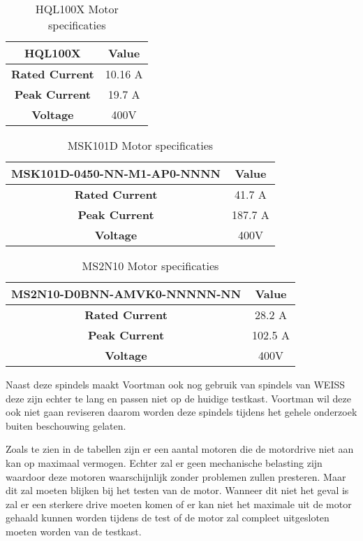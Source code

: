 \begin{table}[H]
	\caption{HQL100X Motor specificaties}
	\label{tab:HQL100X}
	\centering
	\begin{tabular}{|c|c|}
		\hline
		\textbf{HQL100X} & \textbf{Value} \\
		\hline
		\textbf{Rated Current} & 10.16 \gls{A} \\
		\textbf{Peak Current} & 19.7 \gls{A} \\
		\textbf{Voltage} & 400\gls{V} \\
		\hline
	\end{tabular}
\end{table}

\begin{table}[H]
	\caption{MSK101D Motor specificaties}
	\label{tab:HQL100X}
	\centering
	\begin{tabular}{|c|c|}
		\hline
		\textbf{MSK101D-0450-NN-M1-AP0-NNNN} & \textbf{Value} \\
		\hline
		\textbf{Rated Current} & 41.7 \gls{A} \\
		\textbf{Peak Current} & 187.7 \gls{A} \\
		\textbf{Voltage} & 400\gls{V} \\
		\hline
	\end{tabular}
\end{table}

\begin{table}[H]
	\caption{MS2N10 Motor specificaties}
	\label{tab:HQL100X}
	\centering
	\begin{tabular}{|c|c|}
		\hline
		\textbf{MS2N10-D0BNN-AMVK0-NNNNN-NN} & \textbf{Value} \\
		\hline
		\textbf{Rated Current} & 28.2 \gls{A} \\
		\textbf{Peak Current} & 102.5 \gls{A} \\
		\textbf{Voltage} & 400\gls{V} \\
		\hline
	\end{tabular}
\end{table}


Naast deze spindels maakt Voortman ook nog gebruik van spindels van WEISS deze zijn echter te lang en passen niet op de huidige testkast. Voortman wil deze ook niet gaan reviseren daarom worden deze spindels tijdens het gehele onderzoek buiten beschouwing gelaten.

\vspace{0.5cm}

Zoals te zien in de tabellen zijn er een aantal motoren die de motordrive niet aan kan op maximaal vermogen. Echter zal er geen mechanische belasting zijn waardoor deze motoren waarschijnlijk zonder problemen zullen presteren. Maar dit zal moeten blijken bij het testen van de motor. Wanneer dit niet het geval is zal er een sterkere drive moeten komen of er kan niet het maximale uit de motor gehaald kunnen worden tijdens de test of de motor zal compleet uitgesloten moeten worden van de testkast.
